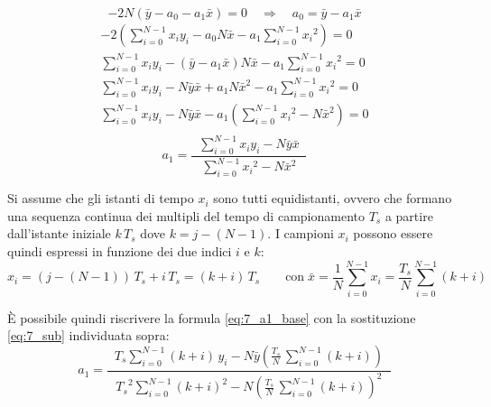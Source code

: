 \begin{equation}
	-2 N \left( \bar{y} - a_0 - a_1 \bar{x} \right) = 0 \quad \Rightarrow \quad a_0 = \bar{y} - a_1 \bar{x}
\end{equation}
\begin{align}
	-2 \left( \sum_{i = 0}^{N-1} x_i y_i - a_0 N \bar{x} - a_1 \sum_{i=0}^{N-1} {x_i}^2 \right) = 0 \\
	\sum_{i = 0}^{N-1} x_i y_i - (\bar{y} - a_1 \bar{x}) N \bar{x} - a_1 \sum_{i=0}^{N-1} {x_i}^2 = 0 \\
	\sum_{i = 0}^{N-1} x_i y_i - N \bar{y} \bar{x} + a_1 N {\bar{x}}^2 - a_1 \sum_{i=0}^{N-1} {x_i}^2 = 0 \\
	\sum_{i = 0}^{N-1} x_i y_i - N \bar{y} \bar{x} - a_1 \left( \sum_{i=0}^{N-1} {x_i}^2 - N {\bar{x}}^2 \right) = 0 \\
\end{align}
\begin{equation}
	a_1 = \frac{\displaystyle \;\; \sum_{i=0}^{N-1} x_i y_i - N \bar{y} \bar{x} \;\;}{\displaystyle \;\; \sum_{i=0}^{N-1} {x_i}^2 - N {\bar{x}}^2 \;\;} \label{eq:7_a1_base}
\end{equation}

Si assume che gli istanti di tempo \(x_i\) sono tutti equidistanti, ovvero che formano una sequenza continua dei multipli del
tempo di campionamento \(T_s\) a partire dall'istante iniziale \(k \, T_s\) dove \(k = j - (N - 1)\). I campioni \(x_i\) possono
essere quindi espressi in funzione dei due indici \(i\) e \(k\):
\begin{equation}
	x_i = (j - (N-1)) \, T_s + i \, T_s = (k + i) \, T_s \qquad \text{con} \; \bar{x} = \frac{1}{N} \sum_{i=0}^{N-1} x_i = \frac{T_s}{N} \sum_{i=0}^{N-1} (k + i)\label{eq:7_sub}
\end{equation}

È possibile quindi riscrivere la formula \eqref{eq:7_a1_base} con la sostituzione \eqref{eq:7_sub} individuata sopra:
\begin{equation}
	a_1 = \frac{\displaystyle \;\; T_s \sum_{i=0}^{N-1} (k + i) \, y_i - N \bar{y} \left(\frac{T_s}{N} \, \sum_{i=0}^{N-1} (k + i)\right) \;\;}{\displaystyle \;\; {T_s}^2 \sum_{i=0}^{N-1} (k + i)^2 - N \left(\frac{T_s}{N} \,\sum_{i=0}^{N-1} (k + i)\right)^2 \;\;}
\end{equation}

\newpage

